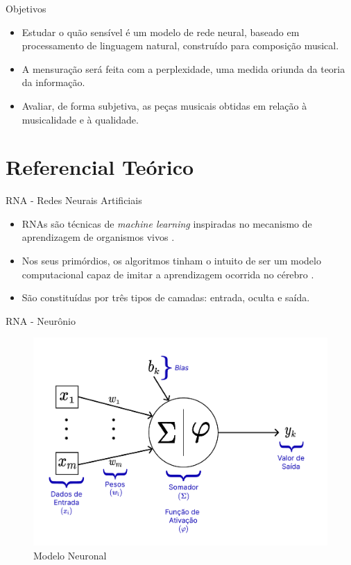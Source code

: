 \documentclass{beamer}
\begin{document}
    \begin{frame}{Objetivos}
        \begin{itemize}
            \justifying
            \item Estudar o quão sensível é um modelo de rede neural, baseado em processamento de linguagem natural, construído para composição musical.
            \item A mensuração será feita com a perplexidade, uma medida oriunda da teoria da informação.
            \item Avaliar, de forma subjetiva, as peças musicais obtidas em relação à musicalidade e à qualidade.
        \end{itemize}
    \end{frame}



\section{Referencial Teórico}
    \begin{frame}{RNA - Redes Neurais Artificiais}
        \begin{itemize}
            \justifying
            \item RNAs são técnicas de \textit{machine learning} inspiradas no mecanismo de aprendizagem de organismos vivos \citep{aggarwal2018}. 
            \item Nos seus primórdios, os algoritmos tinham o intuito de ser um modelo computacional capaz de imitar a aprendizagem ocorrida no cérebro \citep{goodfellow2016}.
            \item São constituídas por três tipos de camadas: entrada, oculta e saída.
        \end{itemize}
    \end{frame}

    \begin{frame}{RNA - Neurônio}
        \begin{figure}
            \includegraphics[scale=0.25]{figuras/neuron_model.pdf}
		    \caption{Modelo Neuronal \citep[adaptado de][]{hair2005,haykin2009}}
	    \end{figure}
    \end{frame}
\end{document}
